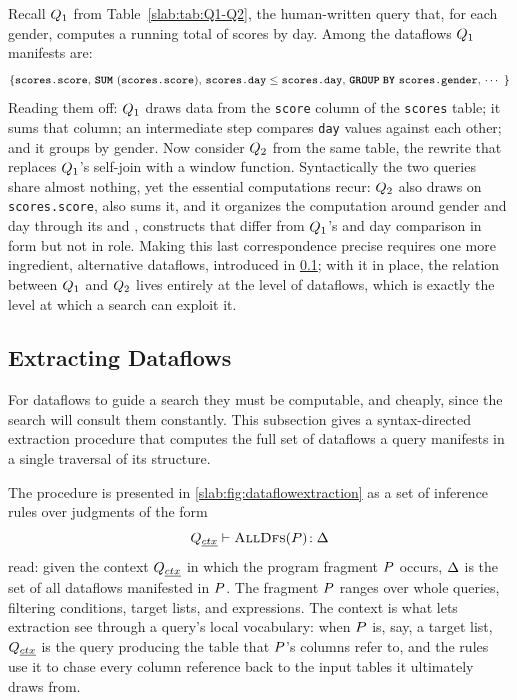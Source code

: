 \begin{example}
Recall $Q_1$ from Table~\ref{slab:tab:Q1-Q2}, the human-written
query that, for each gender, computes a running total of scores by
day. Among the dataflows $Q_1$ manifests are:
{\small
\[
 \left \{
\text{\texttt{scores.score}, \sqlsumcolor(\texttt{scores.score}), $\texttt{scores.day} \leq \texttt{scores.day}$, $\sqlgroupbycolor \ \texttt{scores.gender}$, $\dotsb$ }
\right \}
\]
}
Reading them off: $Q_1$ draws data from the \texttt{score} column
of the \texttt{scores} table; it sums that column; an intermediate
step compares \texttt{day} values against each other; and it groups by
gender. Now consider $Q_2$ from the same table, the rewrite that
replaces $Q_1$'s self-join with a window function. Syntactically
the two queries share almost nothing, yet the essential computations
recur: $Q_2$ also draws on \texttt{scores.score}, also sums it,
and it organizes the computation around gender and day through its
\sqlpartitionbycolor and \sqlorderbycolor, constructs that differ from
$Q_1$'s \sqlgroupbycolor and day comparison in form but not in
role. Making this last correspondence precise requires one more
ingredient, alternative dataflows, introduced in
\cref{slab:sec:dataflow:extraction}; with it in place, the relation
between $Q_1$ and $Q_2$ lives entirely at the level of
dataflows, which is exactly the level at which a search can exploit
it.
\end{example}

\subsection{Extracting Dataflows}
\label{slab:sec:dataflow:extraction}

For dataflows to guide a search they must be computable, and cheaply,
since the search will consult them constantly. This subsection gives a
syntax-directed extraction procedure that computes the full set of
dataflows a query manifests in a single traversal of its structure.

The procedure is presented in \cref{slab:fig:dataflowextraction} as a
set of inference rules over judgments of the form
\[\centering
\calcalldataflowchains{\query_{\emph{ctx}}}{(\program)}{ \dataflowset }
\]
read: given the context $Q_{\emph{ctx}}$ in which the program
fragment $P$ occurs, $\Delta$ is the set of all dataflows
manifested in $P$. The fragment $P$ ranges over whole
queries, filtering conditions, target lists, and expressions. The
context is what lets extraction see through a query's local
vocabulary: when $P$ is, say, a target list,
$Q_{\emph{ctx}}$ is the query producing the table that
$P$'s columns refer to, and the rules use it to chase every
column reference back to the input tables it ultimately draws from.

